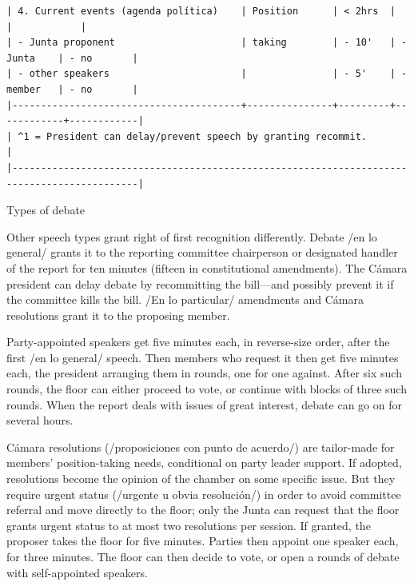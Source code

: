 \documentclass[letter,12pt]{article}
\begin{document}
\begin{table}
\begin{scriptsize}
\begin{verbatim}
| 4. Current events (agenda política)    | Position      | < 2hrs  |            |            |
| - Junta proponent                      | taking        | - 10'   | - Junta    | - no       |
| - other speakers                       |               | - 5'    | - member   | - no       |
|----------------------------------------+---------------+---------+------------+------------|
| ^1 = President can delay/prevent speech by granting recommit.                                |
|--------------------------------------------------------------------------------------------|
\end{verbatim}
  \end{scriptsize}
\caption{Types of debate}\label{T:types}
\end{table}

Other speech types grant right of first recognition differently. Debate /en lo general/ grants it to the reporting committee chairperson or designated handler of the report for ten minutes (fifteen in constitutional amendments). The Cámara president can delay debate by recommitting the bill---and possibly prevent it if the committee kills the bill. /En lo particular/ amendments and Cámara resolutions grant it to the proposing member. 

Party-appointed speakers get five minutes each, in reverse-size order, after the first /en lo general/ speech. Then members who request it then get five minutes each, the president arranging them in rounds, one for one against. After six such rounds, the floor can either proceed to vote, or continue with blocks of three such rounds. When the report deals with issues of great interest, debate can go on for several hours.




Cámara resolutions (/proposiciones con punto de acuerdo/) are tailor-made for members' position-taking needs, conditional on party leader support. If adopted, resolutions become the opinion of the chamber on some specific issue. But they require urgent status (/urgente u obvia resolución/) in order to avoid committee referral and move directly to the floor; only the Junta can request that the floor grants urgent status to at most two resolutions per session. If granted, the proposer takes the floor for five minutes. Parties then appoint one speaker each, for three minutes. The floor can then decide to vote, or open a rounds of debate with self-appointed speakers.
\end{document}
